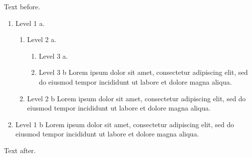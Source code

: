 \documentclass[11pt,twocolumn]{article}
\begin{document}
Text before.
\begin{enumerate}
\item Level 1 a.
\begin{enumerate}
\item Level 2 a.
\begin{enumerate}
\item Level 3 a.
\item Level 3 b Lorem ipsum dolor sit amet, consectetur adipiscing elit, sed do eiusmod tempor incididunt ut labore et dolore magna aliqua.
\end{enumerate}
\item Level 2 b Lorem ipsum dolor sit amet, consectetur adipiscing elit, sed do eiusmod tempor incididunt ut labore et dolore magna aliqua.
\end{enumerate}
\item Level 1 b Lorem ipsum dolor sit amet, consectetur adipiscing elit, sed do eiusmod tempor incididunt ut labore et dolore magna aliqua.
\end{enumerate}
Text after.
\end{document}
